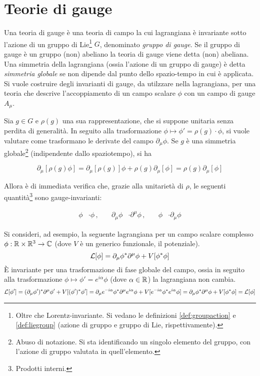 \chapter{Teorie di gauge}\label{cap:gauge}

Una teoria di gauge è una teoria di campo la cui lagrangiana è invariante sotto
l'azione di un gruppo di Lie\footnote{
   Oltre che Lorentz-invariante.
   Si vedano le definizioni \ref{def:groupaction} e \ref{def:liegroup}
   (azione di gruppo e gruppo di Lie, rispettivamente).
} $G$, denominato \emph{gruppo di gauge}. Se il gruppo di gauge è un gruppo (non)
abeliano la teoria di gauge viene detta (non) abeliana.\\

Una simmetria della lagrangiana (ossia  l'azione di un gruppo di gauge) è detta
\emph{simmetria globale} se non dipende dal punto dello spazio-tempo in cui è applicata.\\

Si vuole costruire degli invarianti di gauge, da utilzzare nella lagrangiana,
per una teoria che descrive l'accoppiamento di un campo scalare $\phi$ con un campo
di gauge $A_\mu$.

Sia $g \in G$ e $\rho(g)$ una sua
rappresentazione, che si suppone unitaria senza perdita di generalità.
In seguito alla trasformazione $\phi \mapsto  \phi' = \rho(g) \cdot \phi$,
si vuole valutare come trasformano le derivate del campo $\partial _\mu \phi$.
Se $g$ è una simmetria globale\footnote{
   Abuso di notazione. Si sta identificando un singolo elemento del gruppo, con
   l'azione di gruppo valutata in quell'elemento.
} (indipendente dallo spaziotempo), si ha

$$
   \partial _\mu [\rho(g) \phi]
      = \partial _\mu [\rho(g)] \phi + \rho(g) \partial _\mu [\phi]
      = \rho(g) \partial _\mu [\phi]
$$

Allora è di immediata verifica che, grazie alla unitarietà di $\rho$, le seguenti
quantità\footnote{Prodotti interni.} sono gauge-invarianti:

\begin{equation*}
   \begin{aligned}
      \phi & \cdot \phi \,,& \quad
      \partial _\mu \phi & \cdot \partial ^\mu \phi \,,& \quad
      \phi & \cdot \partial _\mu \phi
   \end{aligned}
\end{equation*}

Si consideri, ad esempio, la seguente lagrangiana per un campo scalare complesso
$\phi : \mathbb{R} \times \mathbb{R}^3 \to \mathbb{C}$ (dove $V$ è un generico funzionale, il potenziale).
$$
   \mathcal{L} [\phi] = \partial _\mu \phi^*  \partial ^\mu \phi + V[\phi ^* \phi]
$$
È invariante per una trasformazione di fase globale del campo, ossia in seguito
alla trasformazione
$
  \phi \mapsto \phi' = e^{i \alpha}\phi
$
(dove $\alpha \in \mathbb{R}$) la lagrangiana non cambia.
$$
   \mathcal{L} [\phi'] = (\partial _\mu \phi')^*  \partial ^\mu \phi' + V[(\phi')^* \phi']
                = \partial _\mu  e^{-i \alpha}\phi^*  \partial ^\mu  e^{i \alpha}\phi
                   +  V[e^{-i \alpha}\phi ^*  e^{i \alpha}\phi]
                = \partial _\mu \phi^*  \partial ^\mu \phi + V[\phi ^* \phi]
                = \mathcal{L} [\phi]
$$

